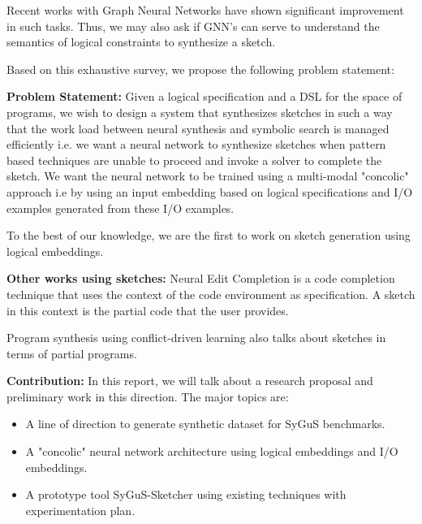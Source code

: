 Recent works \cite{glorot2019learning} with Graph Neural Networks have shown significant improvement in such tasks. Thus,  we may also ask if GNN's can serve to understand the semantics of logical constraints to synthesize a sketch.

\noindent Based on this exhaustive survey, we propose the following problem statement:

\noindent\textbf{Problem Statement:} Given a logical specification and a DSL for the space of programs, we wish to design a system that synthesizes sketches in such a way that the work load between neural synthesis and symbolic search is managed efficiently i.e. we want a neural network to synthesize sketches when pattern based techniques are unable to proceed and invoke a solver to complete the sketch. We want the neural network to be trained using a multi-modal "concolic" approach i.e by using an input embedding based on logical specifications and I/O examples generated from these I/O examples.

To the best of our knowledge, we are the first to work on sketch generation using logical embeddings.

\smallskip
\noindent\textbf{Other works using sketches: } 
Neural Edit Completion \cite{brody2020neural} is a code completion technique that uses the context of the code environment as specification. A sketch in this context is the partial code that the user provides.

Program synthesis using conflict-driven learning \cite{feng2018program} also talks about sketches in terms of partial programs. 

\smallskip
\noindent\textbf{Contribution: } In this report, we will talk about a research proposal and preliminary work in this direction. The major topics are:
\begin{itemize}
\item  A line of direction to generate synthetic dataset for SyGuS benchmarks.
\item  A "concolic" neural network architecture using logical embeddings and I/O embeddings.
\item  A prototype tool SyGuS-Sketcher using existing techniques with experimentation plan.
\end{itemize}